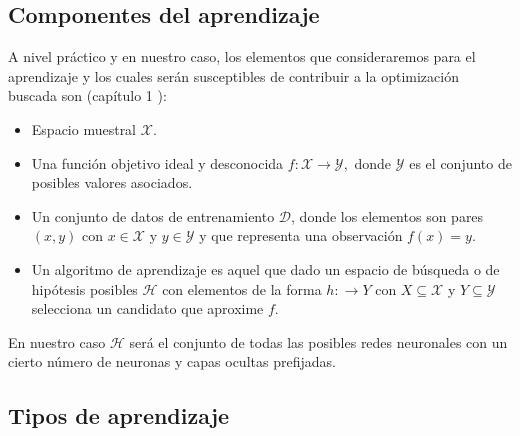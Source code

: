 \subsection{Componentes del aprendizaje}\label{sub:componentes_aprendizaje}  
A nivel práctico y en nuestro caso, los elementos que consideraremos para el aprendizaje y los cuales 
serán susceptibles de contribuir a la optimización buscada son
(capítulo 1 \cite{MostafaLearningFromData}): 







\begin{itemize}
    \item Espacio muestral $\mathcal X$.  
    \item Una función objetivo ideal y desconocida
     $f: \mathcal X \longrightarrow \mathcal{Y},$ 
     donde  $\mathcal{Y}$ es el conjunto de posibles valores asociados. 
    \item Un conjunto de datos de entrenamiento $\mathcal D$, donde los elementos son pares $(x,y)$ con $x \in  \mathcal X$ y 
    $y \in \mathcal{Y}$ y que representa una observación $f(x)=y.$
    \item Un algoritmo de aprendizaje es aquel que dado un espacio de búsqueda o de hipótesis posibles
    $\mathcal{H}$ con elementos de la forma $h: \longrightarrow Y$ con 
    $X \subseteq \mathcal X$ y $Y \subseteq \mathcal Y$ selecciona un candidato que aproxime $f$.
\end{itemize}

En nuestro caso $\mathcal{H}$ será el conjunto de todas las posibles redes neuronales con un cierto 
número de neuronas y capas ocultas prefijadas. 


\subsection{Tipos de aprendizaje}  

